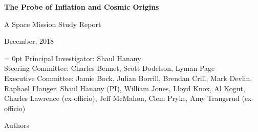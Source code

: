 \documentclass[PICOReport.tex]{subfiles}
\begin{document}

\LARGE{ \centerline{\bf{The Probe of Inflation and Cosmic Origins}}}
\vspace{0.4in}
\Large{ \centerline{A Space Mission Study Report}}
\Large{ \centerline{December, 2018 }}
\vspace{0.4in}
\parindent = 0pt
\normalsize{Principal Investigator: Shaul Hanany} \\
\normalsize{Steering Committee: Charles Bennet, Scott Dodelson, Lyman Page } \\
\normalsize{Executive Committee:  Jamie Bock, Julian Borrill, Brendan Crill, Mark Devlin, Raphael Flauger, Shaul Hanany (PI), William Jones, Lloyd Knox, Al Kogut, Charles Lawrence (ex-officio), Jeff McMahon, Clem Pryke, Amy Trangsrud (ex-officio)} \\

\label{authorlist}

\Large  {\centerline {Authors}}
\end{document}

